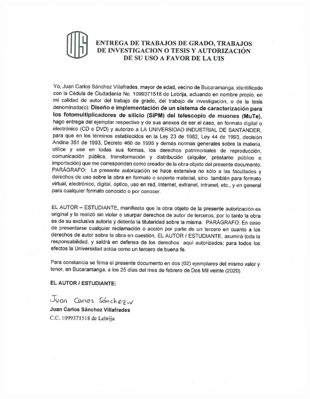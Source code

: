 \begin{center}
\pagestyle{plain}
\includegraphics[trim = 20mm 19mm 19mm 16mm, angle=0.8, clip,width=\textwidth]{Images/carta_juan.pdf}%
\par
\end{center}

